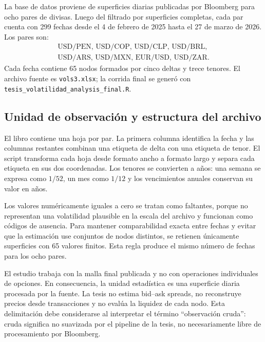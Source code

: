 \documentclass[a4paper,11pt]{article}
\begin{document}
La base de datos proviene de superficies diarias publicadas por Bloomberg para ocho pares de divisas. Luego del filtrado por superficies completas, cada par cuenta con 299 fechas desde el 4 de febrero de 2025 hasta el 27 de marzo de 2026. Los pares son:
\[
\begin{gathered}
\text{USD/PEN, USD/COP, USD/CLP, USD/BRL,}\\
\text{USD/ARS, USD/MXN, EUR/USD, USD/ZAR.}
\end{gathered}
\]
Cada fecha contiene 65 nodos formados por cinco deltas y trece tenores. El archivo fuente es \texttt{vols3.xlsx}; la corrida final se generó con \texttt{tesis\_volatilidad\_analysis\_final.R}.

\subsection{Unidad de observación y estructura del archivo}

El libro contiene una hoja por par. La primera columna identifica la fecha y las columnas restantes combinan una etiqueta de delta con una etiqueta de tenor. El script transforma cada hoja desde formato ancho a formato largo y separa cada etiqueta en sus dos coordenadas. Los tenores se convierten a años: una semana se expresa como \(1/52\), un mes como \(1/12\) y los vencimientos anuales conservan su valor en años.

Los valores numéricamente iguales a cero se tratan como faltantes, porque no representan una volatilidad plausible en la escala del archivo y funcionan como códigos de ausencia. Para mantener comparabilidad exacta entre fechas y evitar que la estimación use conjuntos de nodos distintos, se retienen únicamente superficies con 65 valores finitos. Esta regla produce el mismo número de fechas para los ocho pares.

El estudio trabaja con la malla final publicada y no con operaciones individuales de opciones. En consecuencia, la unidad estadística es una superficie diaria procesada por la fuente. La tesis no estima bid--ask spreads, no reconstruye precios desde transacciones y no evalúa la liquidez de cada nodo. Esta delimitación debe considerarse al interpretar el término ``observación cruda'': cruda significa no suavizada por el pipeline de la tesis, no necesariamente libre de procesamiento por Bloomberg.
\end{document}

